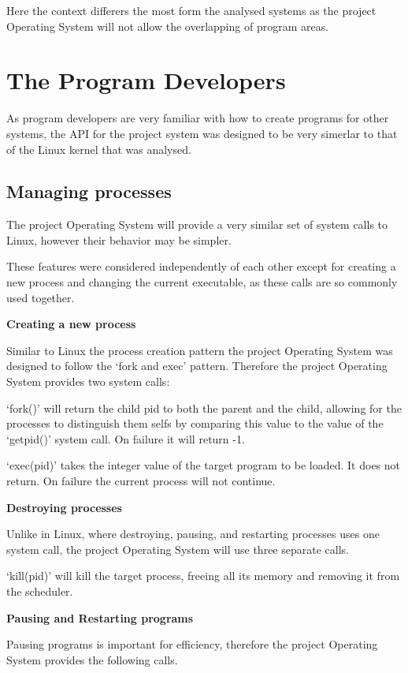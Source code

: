 \documentclass[a4paper]{report}
\begin{document}
Here the context differers the most form the analysed systems as the project Operating System will not allow the overlapping of program areas.



\section{The Program Developers}

As program developers are very familiar with how to create programs for other systems, the API for the project system was designed to be very simerlar to that of the Linux kernel that was analysed.

\subsection{Managing processes}

The project Operating System will provide a very similar set of system calls to Linux, however their behavior may be simpler.

These features were considered independently of each other except for creating a new process and changing the current executable, as these calls are so commonly used together.

\textbf{Creating a new process}

Similar to Linux the process creation pattern the project Operating System was designed to follow the `fork and exec' pattern. Therefore the project Operating System provides two system calls:

`fork()' will return the child pid to both the parent and the child, allowing for the processes to distinguish them selfs by comparing this value to the value of the `get\textunderscore pid()' system call. On failure it will return -1.

`exec(pid)' takes the integer value of the target program to be loaded. It does not return. On failure the current process will not continue.

\textbf{Destroying processes}

Unlike in Linux, where destroying, pausing, and restarting processes uses one system call, the project Operating System will use three separate calls.

`kill(pid)' will kill the target process, freeing all its memory and removing it from the scheduler.

\textbf{Pausing and Restarting programs}

Pausing programs is important for efficiency, therefore the project Operating System provides the following calls.
\end{document}
